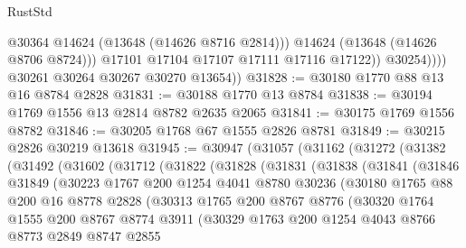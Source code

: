 \begin{lexlean}{RustStd}
\begin{coremodule}
                        @30364
                        @14624
                        (@13648 (@14626 @8716 @2814)))
                      @14624
                      (@13648 (@14626 @8706 @8724)))
                    @17101
                    @17104
                    @17107
                    @17111
                    @17116
                    @17122))
                @30254))))
        @30261
        @30264
        @30267
        @30270
        @13654))
@31828 := @30180 @1770 @88 @13 @16 @8784 @2828
@31831 := @30188 @1770 @13 @8784
@31838 := @30194 @1769 @1556 @13 @2814 @8782 @2635 @2065
@31841 := @30175 @1769 @1556 @8782
@31846 := @30205 @1768 @67 @1555 @2826 @8781
@31849 := @30215 @2826 @30219 @13618
@31945 := @30947
    (@31057
      (@31162
        (@31272
          (@31382
            (@31492
              (@31602
                (@31712
                  (@31822
                    (@31828
                      (@31831
                        (@31838
                          (@31841
                            (@31846
                              @31849
                              (@30223
                                @1767
                                @200
                                @1254
                                @4041
                                @8780
                                @30236
                                (@30180
                                  @1765
                                  @88
                                  @200
                                  @16
                                  @8778
                                  @2828
                                  (@30313
                                    @1765
                                    @200
                                    @8767
                                    @8776
                                    (@30320
                                      @1764
                                      @1555
                                      @200
                                      @8767
                                      @8774
                                      @3911
                                      (@30329
                                        @1763
                                        @200
                                        @1254
                                        @4043
                                        @8766
                                        @8773
                                        @2849
                                        @8747
                                        @2855

\end{coremodule}
\end{lexlean}
